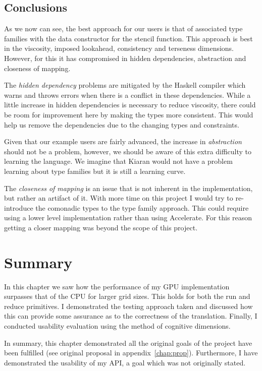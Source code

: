 \documentclass[12pt,a4paper,oneside]{scrbook}
\begin{document}
\subsection{Conclusions}

As we now can see, the best approach for our users is that of associated type
families with the data constructor for the stencil function. This approach is
best in the viscosity, imposed lookahead, consistency and terseness
dimensions. However, for this it has compromised in hidden dependencies,
abstraction and closeness of mapping.

The \emph{hidden dependency} problems are mitigated by the Haskell
compiler which warns and throws errors when there is a conflict in these
dependencies. While a little increase in hidden dependencies is
necessary to reduce viscosity, there could be room for improvement here
by making the types more consistent. This would help us remove the
dependencies due to the changing types and constraints.

Given that our example users are fairly advanced, the increase in
\emph{abstraction} should not be a problem, however, we should be aware of this
extra difficulty to learning the language. We imagine that Kiaran would not have
a problem learning about type families but it is still a learning curve.

The \emph{closeness of mapping} is an issue that is not inherent in the
implementation, but rather an artifact of it. With more time on this
project I would try to re-introduce the comonadic types to the type
family approach. This could require using a lower level implementation
rather than using Accelerate. For this reason getting a closer mapping
was beyond the scope of this project.

\section{Summary}

In this chapter we saw how the performance of my GPU implementation surpasses
that of the CPU for larger grid sizes. This holds for both the run and reduce
primitives. I demonstrated the testing approach taken and discussed how this can
provide some assurance as to the correctness of the translation. Finally, I
conducted usability evaluation using the method of cognitive dimensions.

In summary, this chapter demonstrated all the original goals of the project have
been fulfilled (see original proposal in appendix~\ref{chap:prop}). Furthermore,
I have demonstrated the usability of my API, a goal which was not originally
stated.
\end{document}
